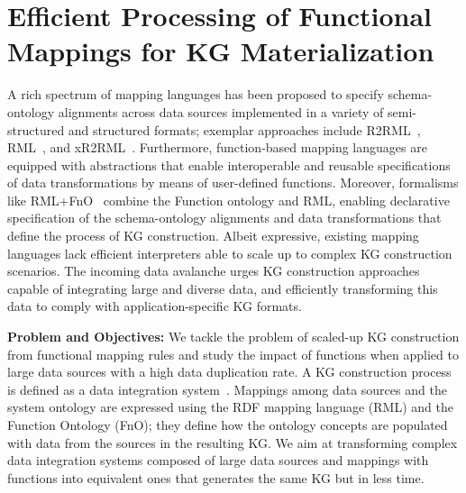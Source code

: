 
\section{Efficient Processing of Functional Mappings for KG Materialization}
\label{chap7_funmap}
A rich spectrum of mapping languages has been proposed to specify schema-ontology alignments across data sources implemented in a variety of semi-structured and structured formats; exemplar approaches include R2RML~\citep{R2RML}, RML~\citep{dimou2014rml}, and xR2RML~\citep{michel2015translation}. Furthermore, function-based mapping languages \citep{de2017declarative,debruyne2016r2rml,junior2016funul,vu2019d} are equipped with abstractions that enable interoperable and reusable specifications of data transformations by means of user-defined functions. Moreover, formalisms like RML+FnO~\citep{de2017declarative} combine the Function ontology and RML, enabling declarative specification of the schema-ontology alignments and data transformations that define the process of KG construction. Albeit expressive, existing mapping languages lack efficient interpreters able to scale up to complex KG construction scenarios. The incoming data avalanche urges KG construction approaches capable of integrating large and diverse data, and efficiently transforming this data to comply with application-specific KG formats.   

\noindent \textbf{Problem and Objectives:} We tackle the problem of scaled-up KG construction from functional mapping rules and study the impact of functions when applied to large data sources with a high data duplication rate. A KG construction process is defined as a data integration system~\citep{Lenzerini02}. Mappings among data sources and the system ontology are expressed using the RDF mapping language (RML) \citep{de2017declarative} and the Function Ontology (FnO); they define how the ontology concepts are populated with data from the sources in the resulting KG. We aim at transforming complex data integration systems composed of large data sources and mappings with functions into equivalent ones that generates the same KG but in less time.

